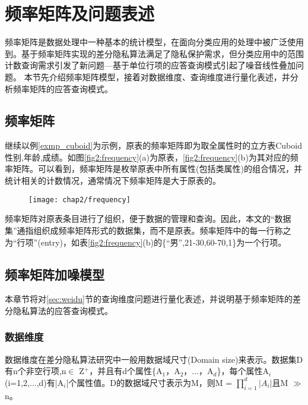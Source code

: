 \section{频率矩阵及问题表述}

频率矩阵是数据处理中一种基本的统计模型\supercite{Dwork-Calibrating}，在面向分类应用的处理中被广泛使用到。基于频率矩阵实现的差分隐私算法满足了隐私保护需求，但分类应用中的范围计数查询需求引发了新问题---基于单位行项的应答查询模式引起了噪音线性叠加问题。%
本节先介绍频率矩阵模型，接着对数据维度、查询维度进行量化表述，并分析频率矩阵的应答查询模式。

\subsection{频率矩阵}

继续以例\ref{exmp_cuboid}为示例，原表的频率矩阵即为取全属性时的立方表Cuboid{性别,年龄,成绩}。如图\ref{fig2:frequency}(a)为原表，\ref{fig2:frequency}(b)为其对应的频率矩阵。可以看到，频率矩阵是枚举原表中所有属性(包括类属性)的组合情况，并统计相关的计数情况，通常情况下频率矩阵是大于原表的。

\begin{figure}[!htp]
	\centering
	\texttt{[image: chap2/frequency]}
\end{figure}

频率矩阵对原表条目进行了组织，便于数据的管理和查询。因此，本文的“数据集”通指组织成频率矩阵形式的数据集，而不是原表。频率矩阵中的每一行称之为“行项”(entry)，如表\ref{fig2:frequency}(b)的\{“男”,21-30,60-70,1\}为一个行项。

\subsection{频率矩阵加噪模型}

本章节将对\ref{sec:weidu}节的查询维度问题进行量化表述，并说明基于频率矩阵的差分隐私算法的应答查询模式。

\subsubsection{数据维度}
数据维度在差分隐私算法研究中一般用数据域尺寸(Domain size)来表示。数据集D有n个非空行项,n$\in$ Z$^{+}$，并且有d个属性\{A$_{1}$，A$_{2}$，...，A$_{d}$\}，每个属性A$_{i}$(i=1,2,...,d)有|A$_{i}$|个属性值。D的数据域尺寸表示为M，则M = \(\prod\limits_{i = 1}^d {|A{_i} |}\)且M $\gg$ n。

